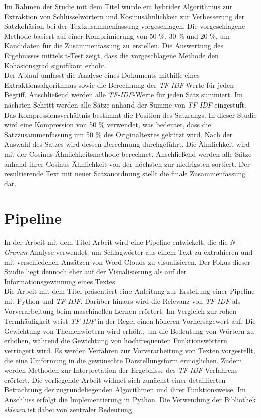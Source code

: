 Im Rahmen der Studie mit dem Titel \cite{darmawan2015hybrid} wurde ein hybrider Algorithmus zur Extraktion von Schlüsselwörtern und Kosinusähnlichkeit zur Verbesserung der Satzkohäsion bei der Textzusammenfassung vorgeschlagen. Die vorgeschlagene Methode basiert auf einer Komprimierung von 50 \%, 30 \% und 20 \%, um Kandidaten für die Zusammenfassung zu erstellen. Die Auswertung des Ergebnisses mittels t-Test zeigt, dass die vorgeschlagene Methode den Kohäsionsgrad signifikant erhöht.\\
Der Ablauf umfasst die Analyse eines Dokuments mithilfe eines Extraktionsalgorithmus sowie die Berechnung der \emph{TF-IDF}-Werte für jeden Begriff. Anschließend werden alle \emph{TF-IDF}-Werte für jeden Satz summiert. Im nächsten Schritt werden alle Sätze anhand der Summe von \emph{TF-IDF} eingestuft. Das Kompressionsverhältnis bestimmt die Position des Satzrangs. In dieser Studie wird eine Kompression von 50 \% verwendet, was bedeutet, dass die Satzzusammenfassung um 50 \% des Originaltextes gekürzt wird. Nach der Auswahl des Satzes wird dessen Berechnung durchgeführt. Die Ähnlichkeit wird mit der Cosinus-Ähnlichkeitsmethode berechnet. Anschließend werden alle Sätze anhand ihrer Cosinus-Ähnlichkeit von der höchsten zur niedrigsten sortiert. Der resultierende Text mit neuer Satzanordnung stellt die finale Zusammenfassung dar.\\

\section{Pipeline}
In der Arbeit mit dem Titel \cite{pirk2019implementierung} Arbeit wird eine Pipeline entwickelt, die die \emph{N-Gramm}-Analyse verwendet, um Schlagwörter aus einem Text zu extrahieren und mit verschiedenen Ansätzen von Word-Clouds zu visualisieren. Der Fokus dieser Studie liegt dennoch eher auf der Visualisierung als auf der Informationsgewinnung eines Textes.\\

Die Arbeit mit dem Titel \cite{lavin2019analyzing} präsentiert eine Anleitung zur Erstellung einer Pipeline mit Python und \emph{TF-IDF}. Darüber hinaus wird die Relevanz von \emph{TF-IDF} als Vorverarbeitung beim maschinellen Lernen erörtert. Im Vergleich zur rohen Termhäufigkeit weist \emph{TF-IDF} in der Regel einen höheren Vorhersagewert auf. Die Gewichtung von Themenwörtern wird erhöht, um die Bedeutung von Wörtern zu erhöhen, während die Gewichtung von hochfrequenten Funktionswörtern verringert wird. Es werden Verfahren zur Vorverarbeitung von Texten vorgestellt, die eine Umformung in die gewünschte Darstellungsform ermöglichen. Zudem werden Methoden zur Interpretation der Ergebnisse des \emph{TF-IDF}-Verfahrens erörtert. Die vorliegende Arbeit widmet sich zunächst einer detaillierten Betrachtung der zugrundeliegenden Algorithmen und ihrer Funktionsweise. Im Anschluss erfolgt die Implementierung in Python. Die Verwendung der Bibliothek \emph{sklearn} ist dabei von zentraler Bedeutung.\\

